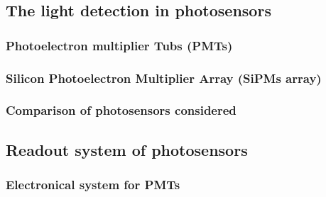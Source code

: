 \documentclass[12pt,a4paper]{book}
\begin{document}
		\subsection{The light detection in photosensors} %
		\label{subsec:Photosensors}
	
			\subsubsection{Photoelectron multiplier Tubs (PMTs)}%
			\label{subsubsec:PMTs}
		
			\subsubsection{Silicon Photoelectron Multiplier Array (SiPMs array)}%
			\label{subsubsec:SiPM}
			
			\subsubsection[Comparison photosensors]{Comparison of photosensors considered}%
			\label{subsubsec:ComparisonPhotosensors}
			\newpage
					
		\subsection{Readout system of photosensors}\label{subsec:Electronic}
			\label{subsec:IntroductionHemos hablado ElectronicalSystem}
	
			\subsubsection[Electronical system for PMTs]{Electronical system for PMTs}
			\label{subsubsec:PMTsElectronicalSystem}
			
\end{document}
